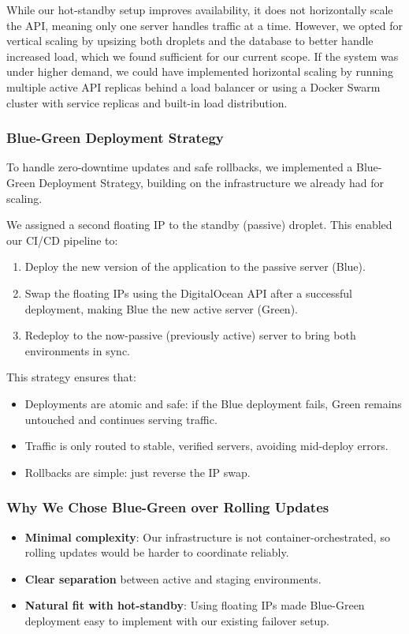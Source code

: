 \noindent While our hot-standby setup improves availability, it does not horizontally scale the API, meaning only one server handles traffic at a time. However, we opted for vertical scaling by upsizing both droplets and the database to better handle increased load, which we found sufficient for our current scope. If the system was under higher demand, we could have implemented horizontal scaling by running multiple active API replicas behind a load balancer or using a Docker Swarm cluster with service replicas and built-in load distribution.

\subsubsection{Blue-Green Deployment Strategy}

To handle zero-downtime updates and safe rollbacks, we implemented a Blue-Green Deployment Strategy, building on the infrastructure we already had for scaling. 

\noindent We assigned a second floating IP to the standby (passive) droplet. This enabled our CI/CD pipeline to:
\begin{enumerate}
  \item Deploy the new version of the application to the passive server (Blue).
  \item Swap the floating IPs using the DigitalOcean API after a successful deployment, making Blue the new active server (Green).
  \item Redeploy to the now-passive (previously active) server to bring both environments in sync.
\end{enumerate}

\noindent This strategy ensures that:
\begin{itemize}
  \item Deployments are atomic and safe: if the Blue deployment fails, Green remains untouched and continues serving traffic.
  \item Traffic is only routed to stable, verified servers, avoiding mid-deploy errors.
  \item Rollbacks are simple: just reverse the IP swap.
\end{itemize}

\subsubsection*{Why We Chose Blue-Green over Rolling Updates}
\begin{itemize}
  \item \textbf{Minimal complexity}: Our infrastructure is not container-orchestrated, so rolling updates would be harder to coordinate reliably.
  \item \textbf{Clear separation} between active and staging environments.
  \item \textbf{Natural fit with hot-standby}: Using floating IPs made Blue-Green deployment easy to implement with our existing failover setup.
\end{itemize}

